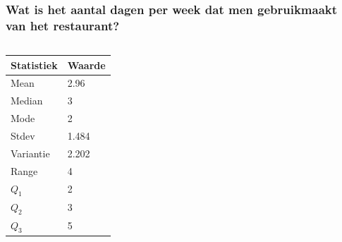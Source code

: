 \documentclass{beamer}
\begin{document}
  \begin{frame}
    \frametitle{Wat is het aantal dagen per week dat men gebruikmaakt van het restaurant?}
    \begin{columns}
      \begin{column}{0.5\textwidth}
        \begin{table}[h]
          \begin{tabular}{|l|l|}
            \hline
            { \textbf{Statistiek}} & \textbf{Waarde} \\ \hline
            Mean                   & 2.96            \\ \hline
            Median                 & 3               \\ \hline
            Mode                   & 2               \\ \hline
            Stdev                  & 1.484           \\ \hline
            Variantie              & 2.202           \\ \hline
            Range                  & 4               \\ \hline
            $Q_{1}$                & 2               \\ \hline
            $Q_{2}$                & 3               \\ \hline
            $Q_{3}$                & 5               \\ \hline
          \end{tabular}
        \end{table}
      \end{column}
      \begin{column}{0.5\textwidth}


\end{column}
\end{columns}
\end{frame}
\end{document}
